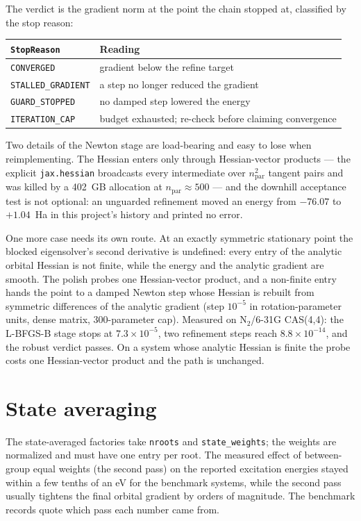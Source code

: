 The verdict is the gradient norm at the point the chain stopped at,
classified by the stop reason:

\begin{center}
\begin{tabular}{ll}
\toprule
\texttt{StopReason} & Reading \\
\midrule
\texttt{CONVERGED} & gradient below the refine target \\
\texttt{STALLED\_GRADIENT} & a step no longer reduced the gradient \\
\texttt{GUARD\_STOPPED} & no damped step lowered the energy \\
\texttt{ITERATION\_CAP} & budget exhausted; re-check before claiming convergence \\
\bottomrule
\end{tabular}
\end{center}

Two details of the Newton stage are load-bearing and easy to lose when
reimplementing.  The Hessian enters only through Hessian-vector
products --- the explicit \texttt{jax.hessian} broadcasts every
intermediate over $n_\mathrm{par}^2$ tangent pairs and was killed by a
402~GB allocation at $n_\mathrm{par} \approx 500$ --- and the
downhill acceptance test is not optional: an unguarded refinement
moved an energy from $-76.07$ to $+1.04$~Ha in this project's history
and printed no error.

One more case needs its own route.  At an exactly symmetric stationary
point the blocked eigensolver's second derivative is undefined: every
entry of the analytic orbital Hessian is not finite, while the energy
and the analytic gradient are smooth.  The polish probes one
Hessian-vector product, and a non-finite entry hands the point to a
damped Newton step whose Hessian is rebuilt from symmetric differences
of the analytic gradient (step $10^{-5}$ in rotation-parameter units,
dense matrix, 300-parameter cap).  Measured on N$_2$/6-31G CAS(4,4):
the L-BFGS-B stage stops at $7.3\times10^{-5}$, two refinement steps
reach $8.8\times10^{-14}$, and the robust verdict passes.  On a system
whose analytic Hessian is finite the probe costs one Hessian-vector
product and the path is unchanged.

\section{State averaging}

The state-averaged factories take \texttt{nroots} and
\texttt{state\_weights}; the weights are normalized and must have one
entry per root.  The measured effect of between-group equal weights
(the second pass) on the reported excitation energies stayed within a
few tenths of an eV for the benchmark systems, while the second pass
usually tightens the final orbital gradient by orders of magnitude.
The benchmark records quote which pass each number came from.

